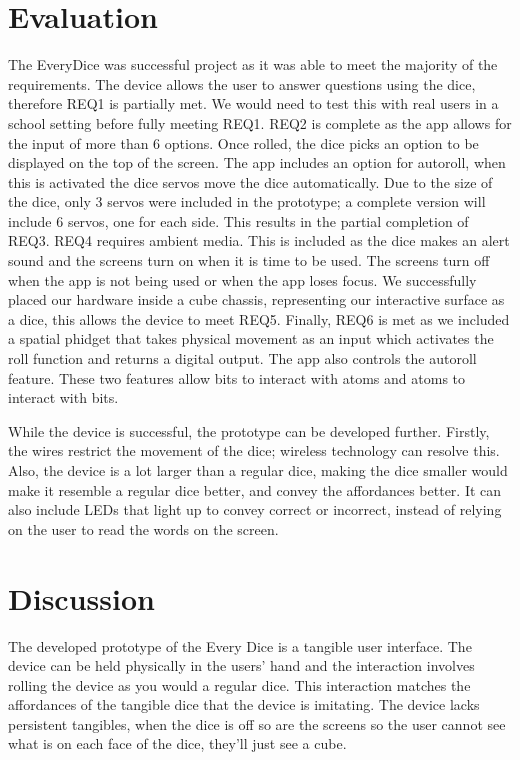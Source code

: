 \documentclass{sigchi}
\begin{document}



\section{Evaluation}

The EveryDice was successful project as it was able to meet the majority of the requirements.  The device allows the user to answer questions using the dice, therefore REQ1 is partially met. We would need to test this with real users in a school setting before fully meeting REQ1. REQ2 is complete as the app allows for the input of more than 6 options. Once rolled, the dice picks an option to be displayed on the top of the screen. The app includes an option for autoroll, when this is activated the dice servos move the dice automatically. Due to the size of the dice, only 3 servos were included in the prototype; a complete version will include 6 servos, one for each side. This results in the partial completion of REQ3. REQ4 requires ambient media. This is included as the dice makes an alert sound and the screens turn on when it is time to be used. The screens turn off when the app is not being used or when the app loses focus. We successfully placed our hardware inside a cube chassis, representing our interactive surface as a dice, this allows the device to meet REQ5. Finally, REQ6 is met as we included a spatial phidget that takes physical movement as an input which activates the roll function and returns a digital output. The app also controls the autoroll feature. These two features allow bits to interact with atoms and atoms to interact with bits. 

While the device is successful, the prototype can be developed further. Firstly, the wires restrict the movement of the dice; wireless technology can resolve this. Also, the device is a lot larger than a regular dice, making the dice smaller would make it resemble a regular dice better, and convey the affordances better. It can also include LEDs that light up to convey correct or incorrect, instead of relying on the user to read the words on the screen. 

\section{Discussion}

The developed prototype of the Every Dice is a tangible user interface. The device can be held physically in the users’ hand and the interaction involves rolling the device as you would a regular dice. This interaction matches the affordances of the tangible dice that the device is imitating. The device lacks persistent tangibles, when the dice is off so are the screens so the user cannot see what is on each face of the dice, they’ll just see a cube. 
\end{document}
